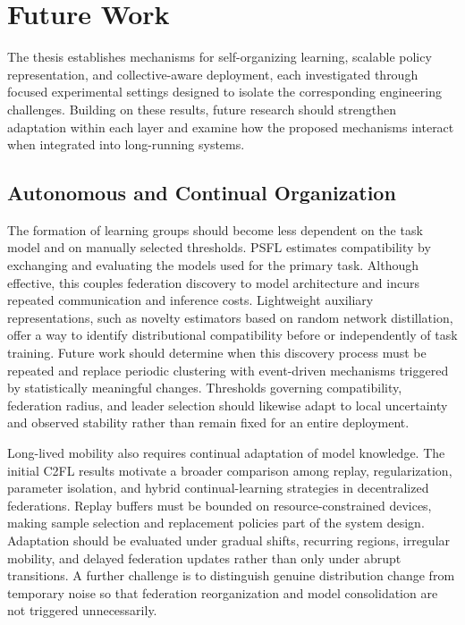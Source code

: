 \section{Future Work}
\label{sec:future-work}

The thesis establishes mechanisms for self-organizing learning,
 scalable policy representation, and collective-aware deployment, 
 each investigated through focused experimental settings designed to isolate 
 the corresponding engineering challenges.
%
Building on these results, 
 future research should strengthen adaptation within each layer and examine how the proposed mechanisms 
 interact when integrated into long-running systems.

\subsection{Autonomous and Continual Organization}

The formation of learning groups should become less dependent 
 on the task model and on manually selected thresholds.
%
PSFL estimates compatibility by exchanging 
 and evaluating the models used for the primary task. 
% 
Although effective, 
 this couples federation discovery to model architecture 
 and incurs repeated communication and inference costs.
%
Lightweight auxiliary representations, 
 such as novelty estimators based on random network distillation, 
 offer a way to identify distributional compatibility before or independently of task training. 
% 
Future work should determine when this discovery process must be repeated 
 and replace periodic clustering with event-driven mechanisms 
 triggered by statistically meaningful changes.
%
Thresholds governing compatibility, federation radius, 
 and leader selection should likewise adapt to local uncertainty 
 and observed stability rather than remain fixed for an entire deployment.

Long-lived mobility also requires continual adaptation of model knowledge.
%
The initial C2FL results motivate a broader comparison among replay, regularization, 
parameter isolation, and hybrid continual-learning strategies in decentralized federations. 
%
Replay buffers must be bounded on resource-constrained devices, 
 making sample selection and replacement policies part of the system design. 
% 
Adaptation should be evaluated under gradual shifts, recurring regions, irregular mobility, 
 and delayed federation updates rather than only under abrupt transitions. 
% 
A further challenge is to distinguish genuine distribution change from temporary noise 
 so that federation reorganization and model consolidation are not triggered unnecessarily.

